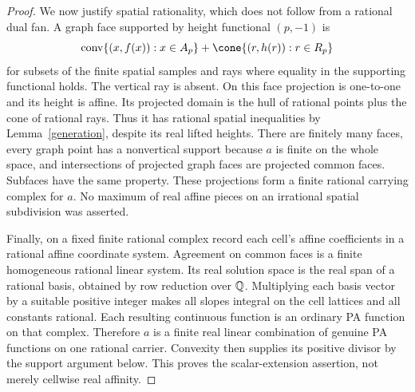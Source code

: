 \documentclass[11pt]{article}
\theoremstyle{definition}\newtheorem{definition}[theorem]{Definition}
\theoremstyle{remark}\newtheorem{remark}[theorem]{Remark}
\begin{document}
\begin{proof}
We now justify spatial rationality, which does not follow from a rational dual fan. A graph face supported by height functional $(p,-1)$ is
\[
\conv\{(x,f(x)):x\in A_p\}+\cone\{(r,h(r)):r\in R_p\}
\]
for subsets of the finite spatial samples and rays where equality in the supporting functional holds. The vertical ray is absent. On this face projection is one-to-one and its height is affine. Its projected domain is the hull of rational points plus the cone of rational rays. Thus it has rational spatial inequalities by Lemma~\ref{generation}, despite its real lifted heights. There are finitely many faces, every graph point has a nonvertical support because $a$ is finite on the whole space, and intersections of projected graph faces are projected common faces. Subfaces have the same property. These projections form a finite rational carrying complex for $a$. No maximum of real affine pieces on an irrational spatial subdivision was asserted.

Finally, on a fixed finite rational complex record each cell's affine coefficients in a rational affine coordinate system. Agreement on common faces is a finite homogeneous rational linear system. Its real solution space is the real span of a rational basis, obtained by row reduction over $\mathbb Q$. Multiplying each basis vector by a suitable positive integer makes all slopes integral on the cell lattices and all constants rational. Each resulting continuous function is an ordinary PA function on that complex. Therefore $a$ is a finite real linear combination of genuine PA functions on one rational carrier. Convexity then supplies its positive divisor by the support argument below. This proves the scalar-extension assertion, not merely cellwise real affinity.
\end{proof}
\end{document}

